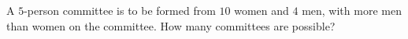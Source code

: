 A $5$-person committee is to be formed from $10$ women and $4$ men, with more men than women on the committee. How many committees are possible?
